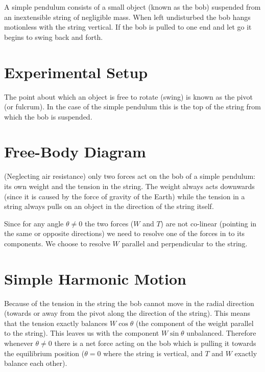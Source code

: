 A simple pendulum consists of a small object (known as the bob) suspended from an inextensible string of negligible mass. When left undisturbed the bob hangs motionless with the string vertical. If the bob is pulled to one end and let go it begins to swing back and forth.

\section{Experimental Setup}

   

   The point about which an object is free to rotate (swing) is known as the pivot (or fulcrum). In the case of the simple pendulum this is the top of the string from which the bob is suspended.

\section{Free-Body Diagram}

   (Neglecting air resistance) only two forces act on the bob of a simple pendulum: its own weight and the tension in the string. The weight always acts downwards (since it is caused by the force of gravity of the Earth) while the tension in a string always pulls on an object in the direction of the string itself.

   

   Since for any angle $\theta \neq 0$ the two forces ($W$ and $T$) are not co-linear (pointing in the same or opposite directions) we need to resolve one of the forces in to its components. We choose to resolve $W$ parallel and perpendicular to the string.

   

\section{Simple Harmonic Motion}

   Because of the tension in the string the bob cannot move in the radial direction (towards or away from the pivot along the direction of the string). This means that the tension exactly balances $W \cos \theta$ (the component of the weight parallel to the string). This leaves us with the component $W \sin \theta$ unbalanced. Therefore whenever $\theta \neq 0$ there is a net force acting on the bob which is pulling it towards the equilibrium position ($\theta = 0$ where the string is vertical, and $T$ and $W$ exactly balance each other).

